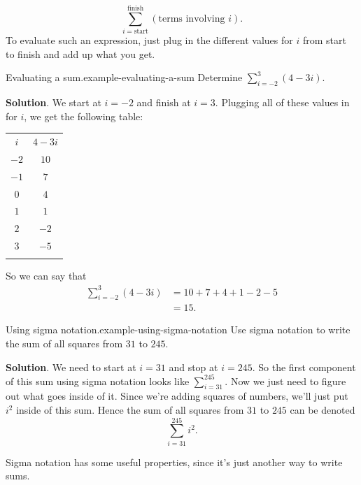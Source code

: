\documentclass[10pt,]{book}
\numberwithin{equation}{section}
\newcommand{\hrulethin}  {\noalign{\hrule height 0.04em}}
\newcommand{\hrulethick} {\noalign{\hrule height 0.11em}}
\begin{document}
\begin{equation*}
\sum_{i=\text{start}}^{\text{finish}}(\text{terms involving }i).
\end{equation*}
To evaluate such an expression, just plug in the different values for \(i\) from start to finish and add up what you get.%
\begin{example}{Evaluating a sum.}{example-evaluating-a-sum}%
\hypertarget{p-411}{}%
Determine \(\sum_{i=-2}^{3}(4-3i).\)%
\par\smallskip%
\noindent\textbf{Solution}.\hypertarget{solution-90}{}\quad%
\hypertarget{p-412}{}%
We start at \(i=-2\) and finish at \(i=3\). Plugging all of these values in for \(i\), we get the following table: \begin{table}
\centering
\begin{tabular}{cc}\hrulethick
\(i\)&\(4-3i\)\tabularnewline\hrulethin
\(-2\)&\(10\)\tabularnewline[0pt]
\(-1\)&\(7\)\tabularnewline[0pt]
\(0\)&\(4\)\tabularnewline[0pt]
\(1\)&\(1\)\tabularnewline[0pt]
\(2\)&\(-2\)\tabularnewline[0pt]
\(3\)&\(-5\)\tabularnewline\hrulethick
\end{tabular}
\end{table}
 So we can say that%
\begin{align*}
\sum_{i=-2}^{3}(4-3i) & =  10 + 7 + 4 + 1 - 2 - 5\\
& = 15. 
\end{align*}
%
\end{example}
\begin{example}{Using sigma notation.}{example-using-sigma-notation}%
\hypertarget{p-413}{}%
Use sigma notation to write the sum of all squares from \(31\) to \(245\).%
\par\smallskip%
\noindent\textbf{Solution}.\hypertarget{solution-91}{}\quad%
\hypertarget{p-414}{}%
We need to start at \(i=31\) and stop at \(i=245\). So the first component of this sum using sigma notation looks like \(\sum_{i=31}^{245}\). Now we just need to figure out what goes inside of it. Since we're adding squares of numbers, we'll just put \(i^{2}\) inside of this sum. Hence the sum of all squares from \(31\) to \(245\) can be denoted%
\begin{equation*}
\sum_{i=31}^{245}i^{2}.
\end{equation*}
%
\end{example}
\hypertarget{p-415}{}%
Sigma notation has some useful properties, since it's just another way to write sums.%
\end{document}
